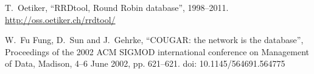 \documentclass{scrartcl}
\begin{document}

\begin{thebibliography}{99}





 T.\ Oetiker, ``RRDtool, Round Robin database'',
  1998--2011.  \url{http://oss.oetiker.ch/rrdtool/}


 W.\ Fu Fung, D.\ Sun and J.\ Gehrke, ``COUGAR: the
  network is the database'', Proceedings of the 2002 ACM SIGMOD
  international conference on Management of Data, Madison, 4--6 June
  2002, pp. 621--621. doi: 10.1145/564691.564775



\end{thebibliography}
\end{document}
